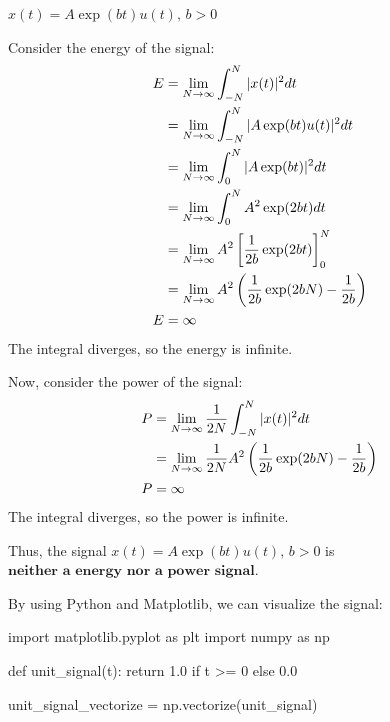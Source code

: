 \documentclass[a4paper, 10pt]{article}
\begin{document}

\newpage

\begin{subproblems}[start=4]
    \item \( x(t) = A\exp(bt)u(t), \, b > 0 \)
\end{subproblems}

\begin{solution}
Consider the energy of the signal:
\begin{align*}
    E &= \lim_{N \to \infty} \int_{-N}^{N} |x(t)|^2 dt \\
    &= \lim_{N \to \infty} \int_{-N}^{N} |A\exp(bt)u(t)|^2 dt \\
    &= \lim_{N \to \infty} \int_{0}^{N} |A\exp(bt)|^2 dt \\
    &= \lim_{N \to \infty} \int_{0}^{N} A^2\exp(2bt) dt \\
    &= \lim_{N \to \infty} A^2 \left[ \frac{1}{2b} \exp(2bt) \right]_{0}^{N} \\
    &= \lim_{N \to \infty} A^2 \left( \frac{1}{2b} \exp(2bN) - \frac{1}{2b} \right) \\
    E &= \infty
\end{align*}
The integral diverges, so the energy is infinite.

\vspace{5mm}

Now, consider the power of the signal:
\begin{align*}
    P &= \lim_{N \to \infty} \frac{1}{2N} \int_{-N}^{N} |x(t)|^2 dt \\
    &= \lim_{N \to \infty} \frac{1}{2N} A^2 \left( \frac{1}{2b} \exp(2bN) - \frac{1}{2b} \right) \\
    P &= \infty
\end{align*}
The integral diverges, so the power is infinite.

\vspace{2mm}

Thus, the signal \( x(t) = A\exp(bt)u(t), \,  b > 0 \) is \( \boxed{\textbf{neither a energy nor a power signal}} \).

\vspace{2mm}

By using Python and Matplotlib, we can visualize the signal:
\begin{codingbox}
import matplotlib.pyplot as plt
import numpy as np

def unit_signal(t):
    return 1.0 if t >= 0 else 0.0

unit_signal_vectorize = np.vectorize(unit_signal)


\end{codingbox}
\end{solution}
\end{document}
